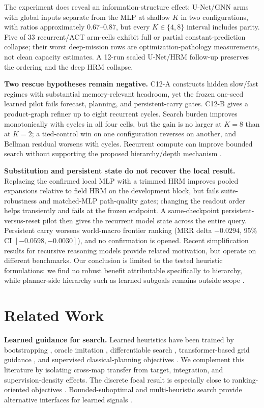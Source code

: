 \documentclass[letterpaper]{article} %
\newcommand{\stage}[1]{\textsc{#1}}
\begin{document}
The experiment does reveal an information-structure effect: U-Net/GNN arms with global inputs separate from the MLP at shallow $K$ in two configurations, with ratios approximately 0.67--0.87, but every $K\in\{4,8\}$ interval includes parity. Five of 33 recurrent/ACT arm-cells exhibit full or partial constant-prediction collapse; their worst deep-mission rows are optimization-pathology measurements, not clean capacity estimates. A 12-run scaled U-Net/HRM follow-up preserves the ordering and the deep HRM collapse.

\textbf{Two rescue hypotheses remain negative.} \stage{C12-A} constructs hidden slow/fast regimes with substantial memory-relevant headroom, yet the frozen one-seed learned pilot fails forecast, planning, and persistent-carry gates. \stage{C12-B} gives a product-graph refiner up to eight recurrent cycles. Search burden improves monotonically with cycles in all four cells, but the gain is no larger at $K=8$ than at $K=2$; a tied-control win on one configuration reverses on another, and Bellman residual worsens with cycles. Recurrent compute can improve bounded search without supporting the proposed hierarchy/depth mechanism \citep{tamar2016vin,lee2018gppn}.

\textbf{Substitution and persistent state do not recover the local result.} Replacing the confirmed local MLP with a trimmed HRM improves pooled expansions relative to field HRM on the development block, but fails suite-robustness and matched-MLP path-quality gates; changing the readout order helps transiently and fails at the frozen endpoint. A same-checkpoint persistent-versus-reset pilot then gives the recurrent model state across the entire query. Persistent carry worsens world-macro frontier ranking (MRR delta $-0.0294$, 95\% CI $[-0.0598,-0.0030]$), and no confirmation is opened. Recent simplification results for recursive reasoning models \citep{jolicoeur2025trm} provide related motivation, but operate on different benchmarks. Our conclusion is limited to the tested heuristic formulations: we find no robust benefit attributable specifically to hierarchy, while planner-side hierarchy such as learned subgoals remains outside scope \citep{czechowski2021subgoal}.

\section{Related Work}

\textbf{Learned guidance for search.} Learned heuristics have been trained by bootstrapping \citep{arfaee2011bootstrap}, oracle imitation \citep{bhardwaj2017sail}, differentiable search \citep{yonetani2021neuralastar}, transformer-based grid guidance \citep{kirilenko2023transpath}, and supervised classical-planning objectives \citep{ferber2020neural}. We complement this literature by isolating cross-map transfer from target, integration, and supervision-density effects. The discrete focal result is especially close to ranking-oriented objectives \citep{chrestien2023rank}. Bounded-suboptimal and multi-heuristic search provide alternative interfaces for learned signals \citep{pohl1970,pearl1982semiadmissible,aine2016mha}.
\end{document}
